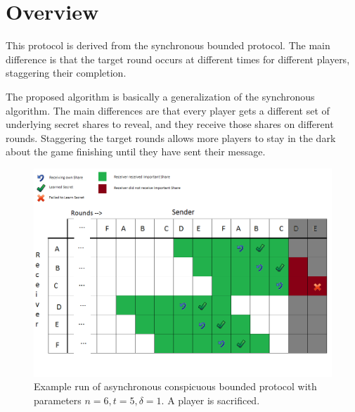 \documentclass{dalcsthesis}
\begin{document}
\section{Overview}

This protocol is derived from the synchronous bounded protocol. The main difference is that the target round occurs at different times for different players, staggering their completion.
 
The proposed algorithm is basically a generalization of the synchronous algorithm. The main differences are that every player gets a different set of underlying secret shares to reveal, and they receive those shares on different rounds. Staggering the target rounds allows more players to stay in the dark about the game finishing until they have sent their message.

\begin{figure}
\includegraphics[width=\textwidth]{../../Graphics/AsyncVerifiedSecret_n6t5d1.png}
\caption{Example run of asynchronous conspicuous bounded protocol with parameters $n=6, t=5, \delta=1$. A player is sacrificed.}
\label{AsyncExample1}
\end{figure}
\end{document}
